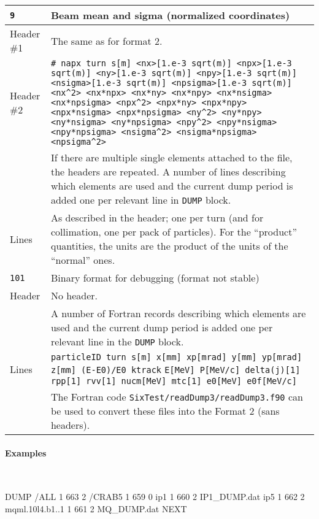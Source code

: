 \begin{center}
\begin{longtable}{|p{1.8cm}|p{13.8cm}|}
            \rowcolor{blue!15}
            \texttt{9} & Beam mean and sigma (normalized coordinates) \\
            \hline
            Header \#1 & The same as for format 2.\\
            \hline
            Header \#2 & \texttt{\# napx turn s[m] <nx>[1.e-3 sqrt(m)] <npx>[1.e-3 sqrt(m)] <ny>[1.e-3 sqrt(m)] <npy>[1.e-3 sqrt(m)] <nsigma>[1.e-3 sqrt(m)] <npsigma>[1.e-3 sqrt(m)] <nx\^{}2> <nx*npx> <nx*ny> <nx*npy> <nx*nsigma> <nx*npsigma> <npx\^{}2> <npx*ny> <npx*npy> <npx*nsigma> <npx*npsigma> <ny\^{}2> <ny*npy> <ny*nsigma> <ny*npsigma> <npy\^{}2> <npy*nsigma> <npy*npsigma> <nsigma\^{}2> <nsigma*npsigma> <npsigma\^{}2>}\vspace{1mm}\\
                       & If there are multiple single elements attached to the file, the headers are repeated. A number of lines describing which elements are used and the current dump period is added one per relevant line in \texttt{DUMP} block.\\
            \hline
            Lines      & As described in the header; one per turn (and for collimation, one per pack of particles). For the ``product'' quantities, the units are the product of the units of the ``normal'' ones. \\
            \hline
        \rowcolor{blue!15}
	\texttt{101} & Binary format for debugging (format not stable) \\
        \hline
        Header & No header.\vspace{1mm}\\
               & A number of Fortran records describing which elements are used and the current dump period is added one per relevant line in the \texttt{DUMP} block.\\
        \hline
	Lines  & \texttt{particleID turn s[m] x[mm] xp[mrad] y[mm] yp[mrad] z[mm] (E-E0)/E0 ktrack} 
		 \texttt{E[MeV] P[MeV/c] delta(j)[1] rpp[1]
			 rvv[1] nucm[MeV] mtc[1] e0[MeV] e0f[MeV/c] } \\
               & The Fortran code \texttt{SixTest/readDump3/readDump3.f90} can be used to convert these files into the Format 2 (sans headers). \\
        \hline
        \end{longtable}
\end{center}

\paragraph{Examples}~
\begin{cverbatim}
DUMP
/ALL 1 663 2
/CRAB5 1 659 0
ip1 1 660 2 IP1_DUMP.dat
ip5 1 662 2
mqml.10l4.b1..1 1 661 2 MQ_DUMP.dat
NEXT
\end{cverbatim}

